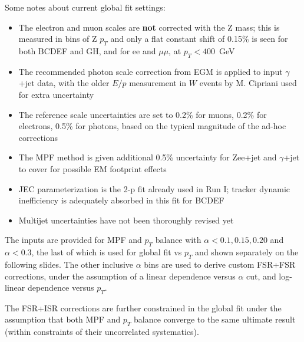 \documentclass[landscape,10pt]{beamer} %
\begin{document}
Some notes about current global fit settings:
\begin{itemize}
\item The electron and muon scales are {\bf not} corrected with the Z mass; this is measured in bins of Z $p_T$ and only a flat constant shift of 0.15\% is seen for both BCDEF and GH, and for ee and $\mu\mu$, at $p_T<400$~GeV
\item The recommended photon scale correction from EGM is applied to input $\gamma$+jet data, with the older $E/p$ measurement in $W$ events by M. Cipriani used for extra uncertainty
\item The reference scale uncertainties are set to 0.2\% for muons, 0.2\% for electrons, 0.5\% for photons, based on the typical magnitude of the ad-hoc corrections
\item The MPF method is given additional 0.5\% uncertainty for Zee+jet and $\gamma$+jet to cover for possible EM footprint effects
\item JEC parameterization is the 2-p fit already used in Run I; tracker dynamic inefficiency is adequately absorbed in this fit for BCDEF
\item Multijet uncertainties have not been thoroughly revised yet
\end{itemize}

\newpage

The inputs are provided for MPF and $p_T$ balance with $\alpha<0.1, 0.15, 0.20$ and $\alpha<0.3$, the last of which is used for global fit vs $p_T$ and shown separately on the following slides. The other inclusive $\alpha$ bins are used to derive custom FSR+FSR corrections, under the assumption of a linear dependence versus $\alpha$ cut, and log-linear dependence versus $p_T$.

The FSR+ISR corrections are further constrained in the global fit under the assumption that both MPF and $p_T$ balance converge to the same ultimate result (within constraints of their uncorrelated systematics).

\newpage
\end{document}
